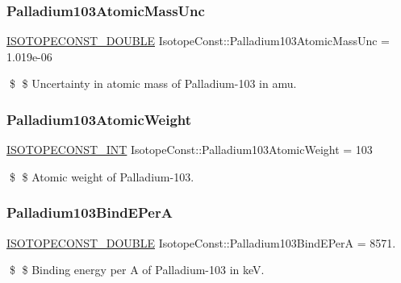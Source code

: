 \subsubsection{\texorpdfstring{Palladium103\+Atomic\+Mass\+Unc}{Palladium103AtomicMassUnc}}
{\footnotesize\ttfamily \mbox{\hyperlink{group___isotope_const-_macros_ga8f45a7272ce02c0b4c65c44636ed719a}{I\+S\+O\+T\+O\+P\+E\+C\+O\+N\+S\+T\+\_\+\+D\+O\+U\+B\+LE}} Isotope\+Const\+::\+Palladium103\+Atomic\+Mass\+Unc = 1.\+019e-\/06}

\$ \$ Uncertainty in atomic mass of Palladium-\/103 in amu. \mbox{\label{group___isotope_const-_palladium-_pd103_gad44790a7f8f29759b01d49cbce313425}} 
\subsubsection{\texorpdfstring{Palladium103\+Atomic\+Weight}{Palladium103AtomicWeight}}
{\footnotesize\ttfamily \mbox{\hyperlink{group___isotope_const-_macros_ga5f18360b3e99483a35c32d789e62621c}{I\+S\+O\+T\+O\+P\+E\+C\+O\+N\+S\+T\+\_\+\+I\+NT}} Isotope\+Const\+::\+Palladium103\+Atomic\+Weight = 103}

\$ \$ Atomic weight of Palladium-\/103. \mbox{\label{group___isotope_const-_palladium-_pd103_gae4a16e26afb2e2936baa187730baa2c5}} 
\subsubsection{\texorpdfstring{Palladium103\+Bind\+E\+PerA}{Palladium103BindEPerA}}
{\footnotesize\ttfamily \mbox{\hyperlink{group___isotope_const-_macros_ga8f45a7272ce02c0b4c65c44636ed719a}{I\+S\+O\+T\+O\+P\+E\+C\+O\+N\+S\+T\+\_\+\+D\+O\+U\+B\+LE}} Isotope\+Const\+::\+Palladium103\+Bind\+E\+PerA = 8571.}

\$ \$ Binding energy per A of Palladium-\/103 in keV. \mbox{\label{group___isotope_const-_palladium-_pd103_gaccbc26eaee727db3d5f4c7a0046c1249}} 
